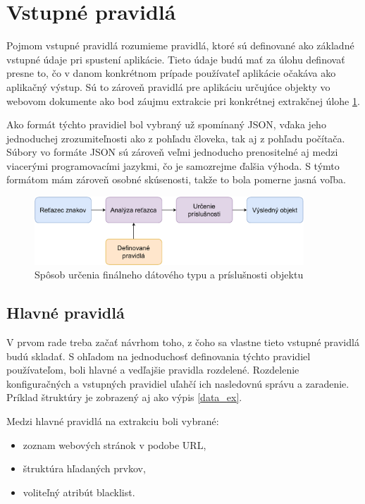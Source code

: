 \newpage
\section{Vstupné pravidlá}

Pojmom vstupné pravidlá rozumieme pravidlá, ktoré sú definované ako základné vstupné údaje pri spustení aplikácie. Tieto údaje budú mať za úlohu definovať presne to, čo v danom konkrétnom prípade používateľ aplikácie očakáva ako aplikačný výstup. Sú to zároveň pravidlá pre aplikáciu určujúce objekty vo webovom dokumente ako bod záujmu extrakcie pri konkrétnej extrakčnej úlohe \ref{rules}.

Ako formát týchto pravidiel bol vybraný už spomínaný JSON, vďaka jeho jednoduchej zrozumiteľnosti ako z pohľadu človeka, tak aj z pohľadu počítača. Súbory vo formáte JSON sú zároveň veľmi jednoducho prenositelné aj medzi viacerými programovacími jazykmi, čo je samozrejme ďalšia výhoda. S týmto formátom mám zároveň osobné skúsenosti, takže to bola pomerne jasná voľba.

\bigskip

\begin{figure}[hbt]
	\centering
	\includegraphics[width=0.9\textwidth]{obrazky-figures/rules.pdf}
	\caption{Spôsob určenia finálneho dátového typu a príslušnosti objektu}
	\label{rules}
\end{figure}

\bigskip

\subsection{Hlavné pravidlá}

V prvom rade treba začať návrhom toho, z čoho sa vlastne tieto vstupné pravidlá budú skladať. S ohľadom na jednoduchosť definovania týchto pravidiel používateľom, boli hlavné a vedľajšie pravidla rozdelené. Rozdelenie konfiguračných a vstupných pravidiel uľahčí ich nasledovnú správu a zaradenie. Príklad štruktúry je zobrazený aj ako výpis \ref{data_ex}.

Medzi hlavné pravidlá na extrakciu boli vybrané:
\begin{itemize}
    \item zoznam webových stránok v podobe URL,
    \item štruktúra hľadaných prvkov,
    \item voliteľný atribút blacklist.
\end{itemize}

